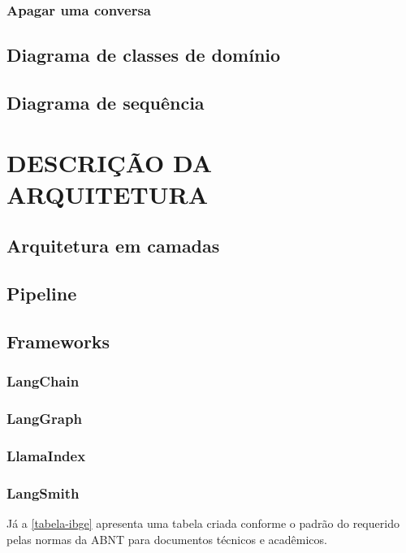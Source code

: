 \documentclass[
	12pt,				%
	openright,			%
	oneside,			    %
	a4paper,				%
	english,			%
	french,			%
	spanish,			%
	brazil			%
	]{abntex2}
\begin{document}
\subsection{Apagar uma conversa}
    
\section{Diagrama de classes de domínio}
\section{Diagrama de sequência}

\chapter{DESCRIÇÃO DA ARQUITETURA}
\section{Arquitetura em camadas}
\section{Pipeline}
\section{Frameworks}
    \subsection{LangChain}
    \subsection{LangGraph}
    \subsection{LlamaIndex}
    \subsection{LangSmith}
    

Já a \autoref{tabela-ibge} apresenta uma tabela criada conforme o padrão do
 requerido pelas normas da ABNT para documentos técnicos e
acadêmicos.
\end{document}
